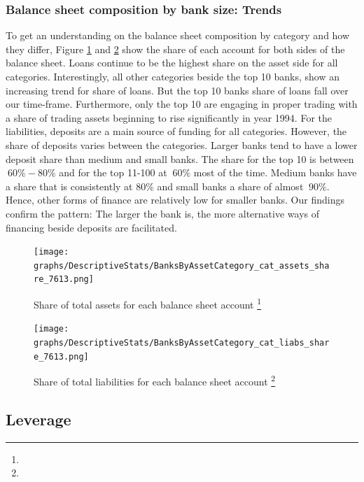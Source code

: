 \documentclass[12pt, a4paper]{article} %
\begin{document}
\subsubsection{Balance sheet composition by bank size: Trends}
\label{sec:CompositionByBankSize}

To get an understanding on the balance sheet composition by category and how they differ, Figure \ref{fig:catAssetsShare} and \ref{fig:catLiabShare} show the share of each account for both sides of the balance sheet. Loans continue to be the highest share on the asset side for all categories. Interestingly, all other categories beside the top 10 banks, show an increasing trend for share of loans. But the top 10 banks share of loans fall over our time-frame. Furthermore, only the top 10 are engaging in proper trading with a share of trading assets beginning to rise significantly in year 1994.
For the liabilities, deposits are a main source of funding for all categories. However, the share of deposits varies between the categories. Larger banks tend to have a lower deposit share than medium and small banks. The share for the top 10 is between $~60\%-80\%$ and for the top 11-100 at $~60\%$ most of the time. Medium banks have a share that is consistently at $80\%$ and small banks a share of almost $~90\%$. Hence, other forms of finance are relatively low for smaller banks. Our findings confirm the pattern: The larger the bank is, the more alternative ways of financing beside deposits are facilitated.


\begin{figure}[H]
\begin{minipage}{\textwidth}
\centering
\caption[1]{Share of total assets for each balance sheet account \footnote{} }
\texttt{[image: graphs/DescriptiveStats/BanksByAssetCategory\_cat\_assets\_share\_7613.png]}
\label{fig:catAssetsShare}
\end{minipage}
\end{figure}


\begin{figure}[H]
\begin{minipage}{\textwidth}
\centering
\caption[1]{Share of total liabilities for each balance sheet account \footnote{} }
\texttt{[image: graphs/DescriptiveStats/BanksByAssetCategory\_cat\_liabs\_share\_7613.png]}
\label{fig:catLiabShare}
\end{minipage}
\end{figure}

\newpage


\subsection{Leverage}
\end{document}
